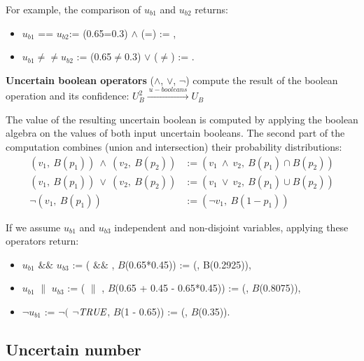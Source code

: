 For example, the comparison of $u_{b1}$ and $u_{b2}$ returns:
\begin{itemize}
	\item $u_{b1}$ == $u_{b2}$:= (0.65=0.3) $\land$ (\true{}=\true{}) := \false{},
	\item $u_{b1} \ne\ne u_{b2}$ := (0.65$\ne$0.3) $\lor$ (\true{}$\ne$\true{}) := \true{}.
\end{itemize}

\begin{operator}
	\textbf{Uncertain boolean operators} ($\land$, $\lor$, $\lnot$) compute the result of the boolean operation and its confidence: $U_B^2 \xrightarrow{~u-booleans~} U_B$
\end{operator}

The value of the resulting uncertain boolean is computed by applying the boolean algebra on the values of both input uncertain booleans.
The second part of the computation combines (union and intersection) their probability distributions:
\begin{align*}
	(v_1,~B(p_1))~\land~(v_2,~B(p_2)) &:= (v_1~\land~v_2,~B(p_1) \cap B(p_2))\\
	(v_1,~B(p_1))~\lor~(v_2,~B(p_2)) &:= (v_1~\lor~v_2,~B(p_1) \cup B(p_2))\\
	\lnot(v_1,~B(p_1)) &:= (\lnot v_1,~B(1-p_1))
\end{align*}

If we assume $u_{b1}$ and $u_{b3}$ independent and non-disjoint variables, applying these operators return:
\begin{itemize}
	\item $u_{b1}$ $\&\&$ $u_{b3}$ := (\true{} $\&\&$ \false{}, $B$(0.65*0.45)) := (\false{}, B(0.2925)),
	\item $u_{b1}$ $\|$ $u_{b3}$ := (\true{} $\|$ \true{}, $B$(0.65 + 0.45 - 0.65*0.45)) := (\true{}, $B$(0.8075)),
	\item $\lnot u_{b1}$ := $\lnot ($ $\lnot \textit{TRUE}{}$, $B$(1 - 0.65)) := (\false{}, $B$(0.35)).
\end{itemize}

\subsection{Uncertain number}
